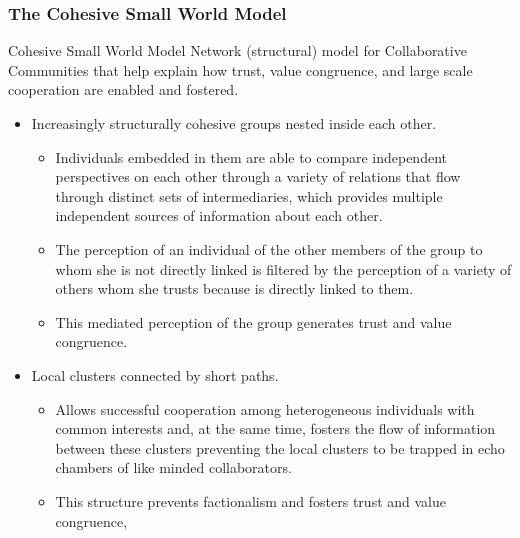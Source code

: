 \documentclass[ignorenonframetext,red,8pt,notes=hide]{beamer}
\begin{document}
\begin{frame}
\frametitle{The Cohesive Small World Model}

\begin{block}{Cohesive Small World Model}
Network (structural) model for Collaborative Communities that help explain how trust, value congruence, and large scale cooperation are enabled and fostered.

\begin{itemize}
\item Increasingly structurally cohesive groups nested inside each other.
\begin{itemize}
\item Individuals embedded in them are able to compare independent perspectives on each other through a variety of relations that flow through distinct sets of intermediaries, which provides multiple independent sources of information about each other.
\item The perception of an individual of the other members of the group to whom she is not directly linked is filtered by the perception of a variety of others whom she trusts because is directly linked to them. 
\item This mediated perception of the group generates trust and value congruence. 
\end{itemize}

\item Local clusters connected by short paths.
\begin{itemize}
\item Allows successful cooperation among heterogeneous individuals with common interests and, at the same time, fosters the flow of information between these clusters preventing the local clusters to be trapped in echo chambers of like minded collaborators.
\item This structure prevents factionalism and fosters trust and value congruence,
\end{itemize}

\end{itemize}
\end{block}



\end{frame}
\end{document}
